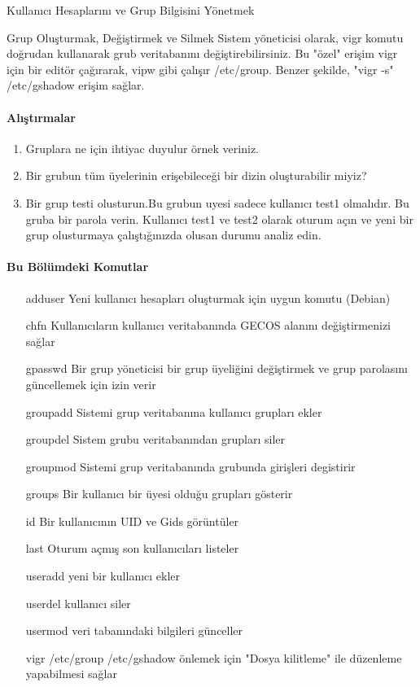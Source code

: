 \begin{section}{Kullanıcı Hesaplarını ve Grup Bilgisini Yönetmek}
\begin{subsection}{Grup Oluşturmak, Değiştirmek ve Silmek}
Sistem yöneticisi olarak, vigr komutu doğrudan kullanarak grub veritabanını değiştirebilirsiniz. Bu "özel" erişim vigr için bir editör çağırarak, vipw gibi çalışır /etc/group. Benzer şekilde, "vigr -s" /etc/gshadow erişim sağlar.

\paragraph{{\Huge{\PencilLeftDown}}Alıştırmalar}{
\begin{enumerate}
\item Gruplara ne için ihtiyac duyulur örnek veriniz.
\item Bir grubun tüm üyelerinin erişebileceği bir dizin oluşturabilir miyiz?
\item Bir grup testi olusturun.Bu grubun uyesi sadece kullanıcı test1 olmalıdır. Bu gruba bir parola verin. Kullanıcı test1 ve test2 olarak oturum açın ve yeni bir grup olusturmaya çalıştığınızda olusan durumu analiz edin.
\end{enumerate}}
\end{subsection}

\paragraph{Bu Bölümdeki Komutlar}{
\begin{itemize}
\item[adduser]Yeni kullanıcı hesapları oluşturmak için uygun komutu (Debian)
\item[chfn]Kullanıcıların kullanıcı veritabanında GECOS alanını değiştirmenizi sağlar
\item[gpasswd]Bir grup yöneticisi bir grup üyeliğini değiştirmek ve grup parolasını güncellemek için izin verir
\item[groupadd]Sistemi grup veritabanına kullanıcı grupları ekler
\item[groupdel]Sistem grubu veritabanından grupları siler
\item[groupmod]Sistemi grup veritabanında grubunda girişleri degistirir
\item[groups]Bir kullanıcı bir üyesi olduğu grupları gösterir
\item[id]Bir kullanıcının UID ve Gids görüntüler
\item[last]Oturum açmış son kullanıcıları listeler
\item[useradd]yeni bir kullanıcı ekler
\item[userdel]kullanıcı siler
\item[usermod]veri tabanındaki bilgileri günceller
\item[vigr]/etc/group /etc/gshadow önlemek için "Dosya kilitleme" ile düzenleme yapabilmesi sağlar
\end{itemize}}


\end{section}
